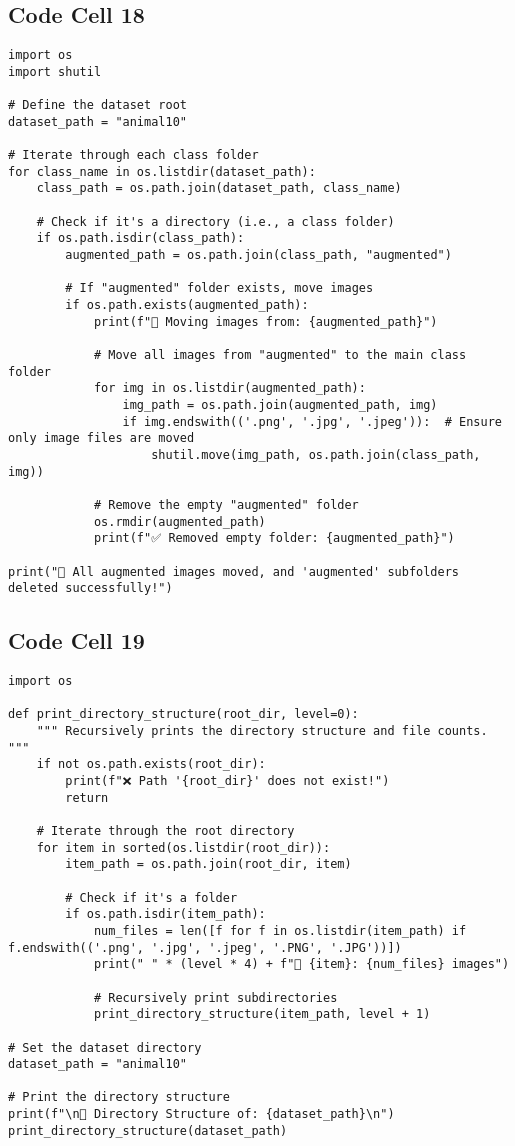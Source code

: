 \documentclass{article}
\begin{document}
\subsection*{Code Cell 18}
\begin{lstlisting}
import os
import shutil

# Define the dataset root
dataset_path = "animal10"

# Iterate through each class folder
for class_name in os.listdir(dataset_path):
    class_path = os.path.join(dataset_path, class_name)

    # Check if it's a directory (i.e., a class folder)
    if os.path.isdir(class_path):
        augmented_path = os.path.join(class_path, "augmented")

        # If "augmented" folder exists, move images
        if os.path.exists(augmented_path):
            print(f"📂 Moving images from: {augmented_path}")

            # Move all images from "augmented" to the main class folder
            for img in os.listdir(augmented_path):
                img_path = os.path.join(augmented_path, img)
                if img.endswith(('.png', '.jpg', '.jpeg')):  # Ensure only image files are moved
                    shutil.move(img_path, os.path.join(class_path, img))

            # Remove the empty "augmented" folder
            os.rmdir(augmented_path)
            print(f"✅ Removed empty folder: {augmented_path}")

print("🎯 All augmented images moved, and 'augmented' subfolders deleted successfully!")
\end{lstlisting}

\subsection*{Code Cell 19}
\begin{lstlisting}
import os

def print_directory_structure(root_dir, level=0):
    """ Recursively prints the directory structure and file counts. """
    if not os.path.exists(root_dir):
        print(f"❌ Path '{root_dir}' does not exist!")
        return

    # Iterate through the root directory
    for item in sorted(os.listdir(root_dir)):
        item_path = os.path.join(root_dir, item)

        # Check if it's a folder
        if os.path.isdir(item_path):
            num_files = len([f for f in os.listdir(item_path) if f.endswith(('.png', '.jpg', '.jpeg', '.PNG', '.JPG'))])
            print(" " * (level * 4) + f"📁 {item}: {num_files} images")

            # Recursively print subdirectories
            print_directory_structure(item_path, level + 1)

# Set the dataset directory
dataset_path = "animal10"

# Print the directory structure
print(f"\n📂 Directory Structure of: {dataset_path}\n")
print_directory_structure(dataset_path)
\end{lstlisting}
\end{document}
